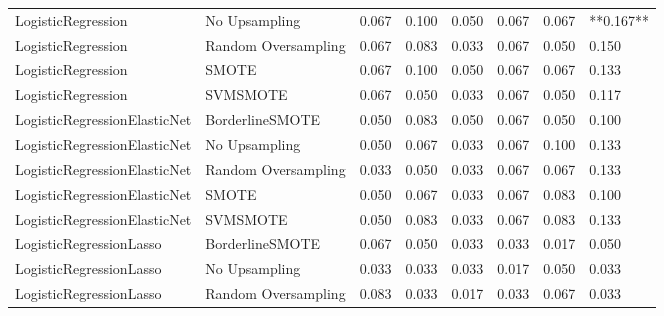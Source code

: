 \begin{tabular}{llllllll}
          LogisticRegression &       No Upsampling & 0.067 &                     0.100 &                 0.050 &                  0.067 &                                   0.067 & **0.167** \\
          LogisticRegression & Random Oversampling & 0.067 &                     0.083 &                 0.033 &                  0.067 &                                   0.050 &     0.150 \\
          LogisticRegression &               SMOTE & 0.067 &                     0.100 &                 0.050 &                  0.067 &                                   0.067 &     0.133 \\
          LogisticRegression &            SVMSMOTE & 0.067 &                     0.050 &                 0.033 &                  0.067 &                                   0.050 &     0.117 \\
LogisticRegressionElasticNet &     BorderlineSMOTE & 0.050 &                     0.083 &                 0.050 &                  0.067 &                                   0.050 &     0.100 \\
LogisticRegressionElasticNet &       No Upsampling & 0.050 &                     0.067 &                 0.033 &                  0.067 &                                   0.100 &     0.133 \\
LogisticRegressionElasticNet & Random Oversampling & 0.033 &                     0.050 &                 0.033 &                  0.067 &                                   0.067 &     0.133 \\
LogisticRegressionElasticNet &               SMOTE & 0.050 &                     0.067 &                 0.033 &                  0.067 &                                   0.083 &     0.100 \\
LogisticRegressionElasticNet &            SVMSMOTE & 0.050 &                     0.083 &                 0.033 &                  0.067 &                                   0.083 &     0.133 \\
     LogisticRegressionLasso &     BorderlineSMOTE & 0.067 &                     0.050 &                 0.033 &                  0.033 &                                   0.017 &     0.050 \\
     LogisticRegressionLasso &       No Upsampling & 0.033 &                     0.033 &                 0.033 &                  0.017 &                                   0.050 &     0.033 \\
     LogisticRegressionLasso & Random Oversampling & 0.083 &                     0.033 &                 0.017 &                  0.033 &                                   0.067 &     0.033 \\

\end{tabular}
